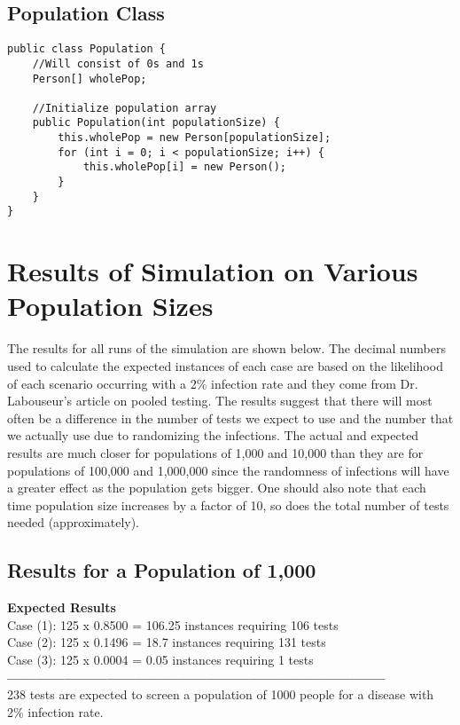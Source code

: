 \documentclass[letterpaper, 10pt,DIV=13]{scrartcl}
\numberwithin{equation}{section} %
\numberwithin{figure}{section} %
\numberwithin{table}{section} %
\begin{document}
\subsection{Population Class}
\begin{lstlisting}
public class Population {
    //Will consist of 0s and 1s
    Person[] wholePop; 
    
    //Initialize population array
    public Population(int populationSize) {
        this.wholePop = new Person[populationSize];
        for (int i = 0; i < populationSize; i++) {
            this.wholePop[i] = new Person();
        }
    }
}
\end{lstlisting}

\section{Results of Simulation on Various Population Sizes}\label{operations}
The results for all runs of the simulation are shown below. The decimal numbers used to calculate the expected instances of each case are based on the likelihood of each scenario occurring with a 2\% infection rate and they come from Dr. Labouseur's article on pooled testing. The results suggest that there will most often be a difference in the number of  tests we expect to use and the number that we actually use due to randomizing the infections. The actual and expected results are much closer for populations of 1,000 and 10,000 than they are for populations of 100,000 and 1,000,000 since the randomness of infections will have a greater effect as the population gets bigger. One should also note that each time population size increases by a factor of 10, so does the total number of tests needed (approximately).

\subsection{Results for a Population of 1,000}
\lstset{numbers=left, numberstyle=\tiny, stepnumber=1, numbersep=5pt, basicstyle=\footnotesize\ttfamily}
\textbf{Expected Results} \\ 
Case (1): 125 x 0.8500 = 106.25 instances requiring 106 tests \\ 
Case (2): 125 x 0.1496 = 18.7 instances requiring 131 tests \\ 
Case (3): 125 x 0.0004 = 0.05 instances requiring 1 tests \\ 
\textbf{\---------------------------------------------------------------------------------} \\ 
238 tests are expected to screen a population of 1000 people for a disease with 2\% infection rate. \\ 
\end{document}
